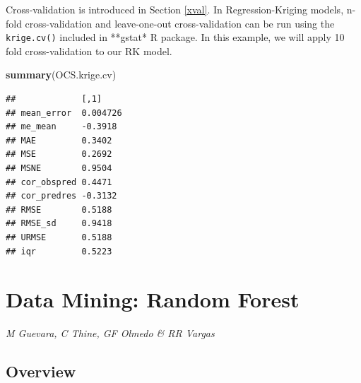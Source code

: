 \documentclass[10pt,b5paper,]{book}
\newenvironment{Shaded}{\begin{snugshade}}{\end{snugshade}}
\newcommand{\CommentTok}[1]{\textcolor[rgb]{0.56,0.35,0.01}{\textit{#1}}}
\newcommand{\DataTypeTok}[1]{\textcolor[rgb]{0.13,0.29,0.53}{#1}}
\newcommand{\DecValTok}[1]{\textcolor[rgb]{0.00,0.00,0.81}{#1}}
\newcommand{\KeywordTok}[1]{\textcolor[rgb]{0.13,0.29,0.53}{\textbf{#1}}}
\newcommand{\NormalTok}[1]{#1}
\newcommand{\OperatorTok}[1]{\textcolor[rgb]{0.81,0.36,0.00}{\textbf{#1}}}
\newcommand{\StringTok}[1]{\textcolor[rgb]{0.31,0.60,0.02}{#1}}
\theoremstyle{definition}
\theoremstyle{definition}
\theoremstyle{definition}
\theoremstyle{remark}
\begin{document}
Cross-validation  is introduced in Section
\ref{xval}. In Regression-Kriging models, n-fold cross-validation and
leave-one-out cross-validation can be run using the \texttt{krige.cv()}
included in **gstat* R package. In this example, we will apply 10 fold
cross-validation to our RK model.

\begin{Shaded}
\end{Shaded}

\begin{Shaded}
\begin{Highlighting}[]
\KeywordTok{summary}\NormalTok{(OCS.krige.cv)}
\end{Highlighting}
\end{Shaded}

\begin{verbatim}
##             [,1]    
## mean_error  0.004726
## me_mean     -0.3918 
## MAE         0.3402  
## MSE         0.2692  
## MSNE        0.9504  
## cor_obspred 0.4471  
## cor_predres -0.3132 
## RMSE        0.5188  
## RMSE_sd     0.9418  
## URMSE       0.5188  
## iqr         0.5223
\end{verbatim}

\clearpage

\hypertarget{rf}{%
\section{Data Mining: Random Forest}\label{rf}}

\emph{M Guevara, C Thine, GF Olmedo \& RR Vargas}

\hypertarget{overview-2}{%
\subsection{Overview}\label{overview-2}}
\end{document}
